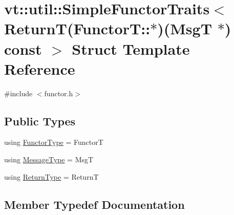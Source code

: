 \hypertarget{structvt_1_1util_1_1_simple_functor_traits_3_01_return_t_07_functor_t_1_1_5_08_07_msg_t_01_5_08_01const_01_4}{}\section{vt\+:\+:util\+:\+:Simple\+Functor\+Traits$<$ ReturnT(FunctorT\+:\+:$\ast$)(MsgT $\ast$) const $>$ Struct Template Reference}
\label{structvt_1_1util_1_1_simple_functor_traits_3_01_return_t_07_functor_t_1_1_5_08_07_msg_t_01_5_08_01const_01_4}


{\ttfamily \#include $<$functor.\+h$>$}

\subsection*{Public Types}
\begin{DoxyCompactItemize}
\item 
using \hyperlink{structvt_1_1util_1_1_simple_functor_traits_3_01_return_t_07_functor_t_1_1_5_08_07_msg_t_01_5_08_01const_01_4_a8c0b9ea402a3db174bb783d773ccb32a}{Functor\+Type} = FunctorT
\item 
using \hyperlink{structvt_1_1util_1_1_simple_functor_traits_3_01_return_t_07_functor_t_1_1_5_08_07_msg_t_01_5_08_01const_01_4_a870beac7dc2aaa78802504a737160399}{Message\+Type} = MsgT
\item 
using \hyperlink{structvt_1_1util_1_1_simple_functor_traits_3_01_return_t_07_functor_t_1_1_5_08_07_msg_t_01_5_08_01const_01_4_affaab9f38aa87410acecb852bc5c3866}{Return\+Type} = ReturnT
\end{DoxyCompactItemize}


\subsection{Member Typedef Documentation}
\mbox{\label{structvt_1_1util_1_1_simple_functor_traits_3_01_return_t_07_functor_t_1_1_5_08_07_msg_t_01_5_08_01const_01_4_a8c0b9ea402a3db174bb783d773ccb32a}} 
